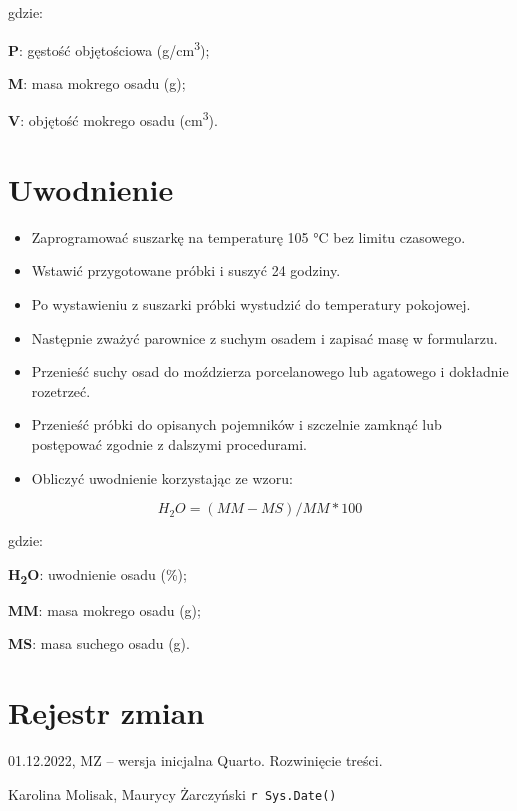 \documentclass[
  letterpaper,
  DIV=11,
  numbers=noendperiod]{scrreprt}
\begin{document}
gdzie:

\textbf{P}: gęstość objętościowa (g/cm\textsuperscript{3});

\textbf{M}: masa mokrego osadu (g);

\textbf{V}: objętość mokrego osadu (cm\textsuperscript{3}).

\hypertarget{uwodnienie}{%
\section{Uwodnienie}\label{uwodnienie}}

\begin{itemize}
\item
  Zaprogramować suszarkę na temperaturę 105 °C bez limitu czasowego.
\item
  Wstawić przygotowane próbki i suszyć 24 godziny.
\item
  Po wystawieniu z suszarki próbki wystudzić do temperatury pokojowej.
\item
  Następnie zważyć parownice z suchym osadem i zapisać masę w
  formularzu.
\item
  Przenieść suchy osad do moździerza porcelanowego lub agatowego i
  dokładnie rozetrzeć.
\item
  Przenieść próbki do opisanych pojemników i szczelnie zamknąć lub
  postępować zgodnie z dalszymi procedurami.
\item
  Obliczyć uwodnienie korzystając ze wzoru:
\end{itemize}

\[H_2O = (MM - MS) / MM * 100\]

gdzie:

\textbf{H\textsubscript{2}O}: uwodnienie osadu (\%);

\textbf{MM}: masa mokrego osadu (g);

\textbf{MS}: masa suchego osadu (g).

\hypertarget{rejestr-zmian-15}{%
\section{Rejestr zmian}\label{rejestr-zmian-15}}

01.12.2022, MZ -- wersja inicjalna Quarto. Rozwinięcie treści.

Karolina Molisak, Maurycy Żarczyński \texttt{r\ Sys.Date()}
\end{document}
